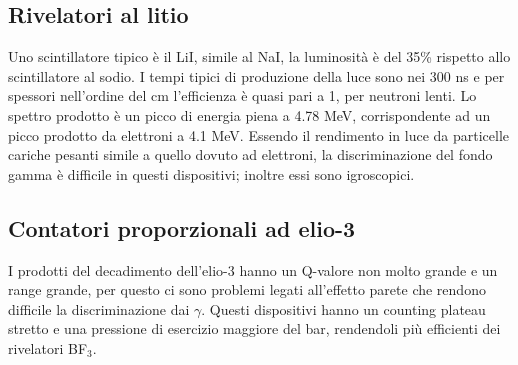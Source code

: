 \subsection{Rivelatori al litio}
Uno scintillatore tipico \`e il LiI, simile al NaI, la luminosit\`a \`e del 35\% rispetto allo scintillatore al sodio.
I tempi tipici di produzione della luce sono nei 300 ns e per spessori nell'ordine del cm l'efficienza \`e quasi pari a 1, per neutroni lenti.
Lo spettro prodotto \`e un picco di energia piena a 4.78 MeV, corrispondente ad un picco prodotto da elettroni a 4.1 MeV.
Essendo il rendimento in luce da particelle cariche pesanti simile a quello dovuto ad elettroni, la discriminazione del fondo gamma \`e difficile in questi dispositivi;
inoltre essi sono igroscopici.
\subsection{Contatori proporzionali ad elio-3}
I prodotti del decadimento dell'elio-3 hanno un Q-valore non molto grande e un range grande, per questo ci sono problemi legati all'effetto parete che
rendono difficile la discriminazione dai $\gamma$.
Questi dispositivi hanno un counting plateau stretto e una pressione di esercizio maggiore del bar, rendendoli pi\`u efficienti dei rivelatori BF$_3$. 